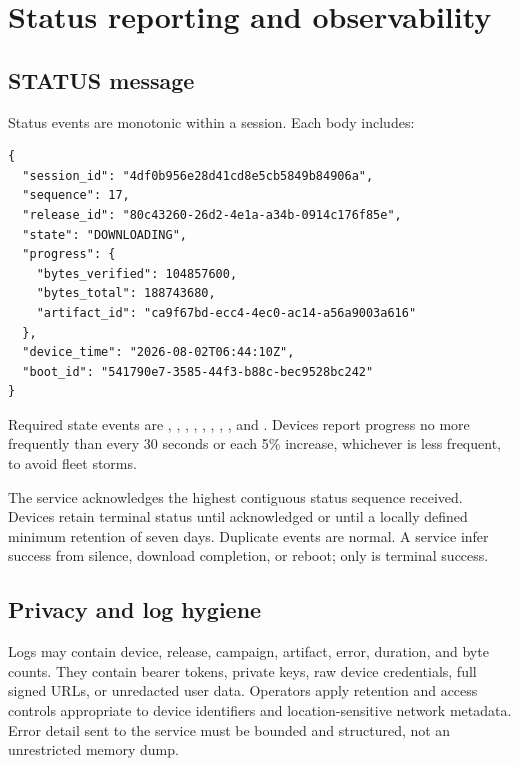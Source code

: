 \section{Status reporting and observability}

\subsection{STATUS message}

Status events are monotonic within a session. Each body includes:

\begin{lstlisting}[language={}]
{
  "session_id": "4df0b956e28d41cd8e5cb5849b84906a",
  "sequence": 17,
  "release_id": "80c43260-26d2-4e1a-a34b-0914c176f85e",
  "state": "DOWNLOADING",
  "progress": {
    "bytes_verified": 104857600,
    "bytes_total": 188743680,
    "artifact_id": "ca9f67bd-ecc4-4ec0-ac14-a56a9003a616"
  },
  "device_time": "2026-08-02T06:44:10Z",
  "boot_id": "541790e7-3585-44f3-b88c-bec9528bc242"
}
\end{lstlisting}

Required state events are , ,
, , ,
, , , and
. Devices \should report progress no more frequently than every 30
seconds or each 5\% increase, whichever is less frequent, to avoid fleet storms.

The service acknowledges the highest contiguous status sequence received.
Devices retain terminal status until acknowledged or until a locally defined
minimum retention of seven days. Duplicate events are normal. A service \mustnot
infer success from silence, download completion, or reboot; only 
is terminal success.

\subsection{Privacy and log hygiene}

Logs may contain device, release, campaign, artifact, error, duration, and byte
counts. They \mustnot contain bearer tokens, private keys, raw device credentials,
full signed URLs, or unredacted user data. Operators \should apply retention and
access controls appropriate to device identifiers and location-sensitive network
metadata. Error detail sent to the service must be bounded and structured, not an
unrestricted memory dump.

